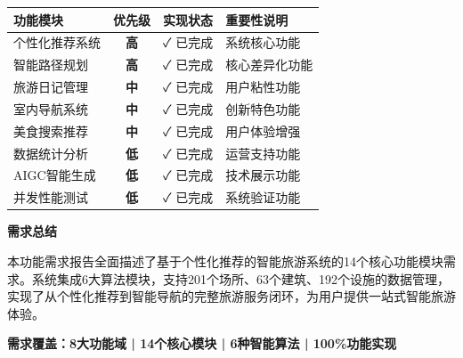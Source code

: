 \documentclass[12pt,a4paper]{article}
\begin{document}
\begin{table}[H]
\centering
\begin{tcolorbox}[
    colback=light,
    colframe=primary,
    title={\textbf{功能需求优先级排序}},
    coltitle=white,
    colbacktitle=primary,
    fonttitle=\bfseries,
    rounded corners=5pt,
    width=0.95\textwidth
]
\begin{tabular}{lccl}
\toprule
\rowcolor{primary!20}
\textbf{功能模块} & \textbf{优先级} & \textbf{实现状态} & \textbf{重要性说明} \\
\midrule
个性化推荐系统 & \textcolor{danger}{\textbf{高}} & \textcolor{success}{✓ 已完成} & 系统核心功能 \\
\rowcolor{light}
智能路径规划 & \textcolor{danger}{\textbf{高}} & \textcolor{success}{✓ 已完成} & 核心差异化功能 \\
旅游日记管理 & \textcolor{warning}{\textbf{中}} & \textcolor{success}{✓ 已完成} & 用户粘性功能 \\
\rowcolor{light}
室内导航系统 & \textcolor{warning}{\textbf{中}} & \textcolor{success}{✓ 已完成} & 创新特色功能 \\
美食搜索推荐 & \textcolor{warning}{\textbf{中}} & \textcolor{success}{✓ 已完成} & 用户体验增强 \\
\rowcolor{light}
数据统计分析 & \textcolor{secondary}{\textbf{低}} & \textcolor{success}{✓ 已完成} & 运营支持功能 \\
AIGC智能生成 & \textcolor{secondary}{\textbf{低}} & \textcolor{success}{✓ 已完成} & 技术展示功能 \\
\rowcolor{light}
并发性能测试 & \textcolor{secondary}{\textbf{低}} & \textcolor{success}{✓ 已完成} & 系统验证功能 \\
\bottomrule
\end{tabular}
\end{tcolorbox}
\end{table}

\vfill

\begin{center}
\begin{tcolorbox}[
    colback=primary,
    coltext=white,
    halign=center,
    rounded corners=10pt,
    drop shadow,
    width=0.95\textwidth
]
\textbf{\LARGE 需求总结}\\[0.5cm]

\begin{minipage}{0.9\textwidth}
\centering
本功能需求报告全面描述了基于个性化推荐的智能旅游系统的14个核心功能模块需求。系统集成6大算法模块，支持201个场所、63个建筑、192个设施的数据管理，实现了从个性化推荐到智能导航的完整旅游服务闭环，为用户提供一站式智能旅游体验。

\vspace{0.3cm}

\textcolor{accent}{\textbf{需求覆盖：8大功能域 | 14个核心模块 | 6种智能算法 | 100\%功能实现}}
\end{minipage}
\end{tcolorbox}
\end{center}
\end{document}
